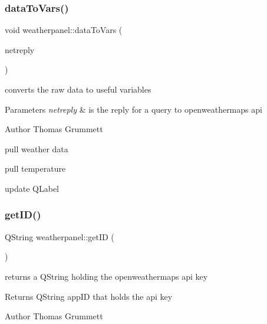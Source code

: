 \subsubsection{\texorpdfstring{data\+To\+Vars()}{dataToVars()}}
{\footnotesize\ttfamily void weatherpanel\+::data\+To\+Vars (\begin{DoxyParamCaption}\item[{Q\+Network\+Reply $\ast$}]{netreply }\end{DoxyParamCaption})\hspace{0.3cm}{\ttfamily [private]}}



converts the raw data to useful variables 


\begin{DoxyParams}{Parameters}
{\em netreply} & is the reply for a query to openweathermaps api \\
\hline
\end{DoxyParams}
\begin{DoxyAuthor}{Author}
Thomas Grummett 
\end{DoxyAuthor}
pull weather data

pull temperature

update Q\+Label \mbox{\label{classweatherpanel_a6f90f234561aa11f374fbd6f89e4c02b}} 
\subsubsection{\texorpdfstring{get\+I\+D()}{getID()}}
{\footnotesize\ttfamily Q\+String weatherpanel\+::get\+ID (\begin{DoxyParamCaption}{ }\end{DoxyParamCaption})}



returns a Q\+String holding the openweathermaps api key 

\begin{DoxyReturn}{Returns}
Q\+String app\+ID that holds the api key 
\end{DoxyReturn}
\begin{DoxyAuthor}{Author}
Thomas Grummett 
\end{DoxyAuthor}
\mbox{\label{classweatherpanel_a56fe31e2484d3266b9b039eaec58da7d}} 
